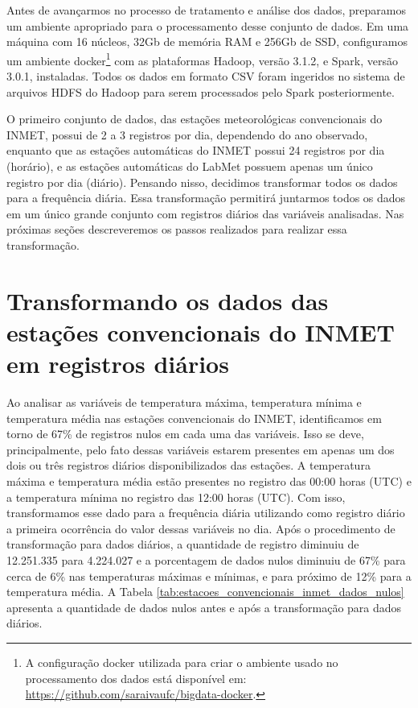 Antes de avançarmos no processo de tratamento e análise dos dados, preparamos um ambiente apropriado para o processamento desse conjunto de dados. 
Em uma máquina com 16 núcleos, 32Gb de memória RAM e 256Gb de SSD, configuramos um ambiente docker\footnote{A configuração docker utilizada para criar o ambiente usado no processamento dos dados está disponível em: \href{https://github.com/saraivaufc/bigdata-docker}{https://github.com/saraivaufc/bigdata-docker}.} com as plataformas Hadoop, versão 3.1.2, e Spark, versão 3.0.1, instaladas. Todos os dados em formato CSV foram ingeridos no sistema de arquivos HDFS do Hadoop para serem processados pelo Spark posteriormente.  

O primeiro conjunto de dados, das estações meteorológicas convencionais do INMET, possui de 2 a 3 registros por dia, dependendo do ano observado, enquanto que as estações automáticas do INMET possui 24 registros por dia (horário), e as estações automáticas do LabMet possuem apenas um único registro por dia (diário). Pensando nisso, decidimos transformar todos os dados para a frequência diária. Essa transformação permitirá juntarmos todos os dados em um único grande conjunto com registros diários das variáveis analisadas. Nas próximas seções descreveremos os passos realizados para realizar essa transformação. 

\section{Transformando os dados das estações convencionais do INMET em registros diários}

Ao analisar as variáveis de temperatura máxima, temperatura mínima e temperatura média nas estações convencionais do INMET, identificamos em torno de 67\% de registros nulos em cada uma das variáveis. Isso se deve, principalmente, pelo fato dessas variáveis estarem presentes em apenas um dos dois ou três registros diários disponibilizados das estações. A temperatura máxima e temperatura média estão presentes no registro das 00:00 horas (UTC) e a temperatura mínima no registro das 12:00 horas (UTC). Com isso, transformamos esse dado para a frequência diária utilizando como registro diário a primeira ocorrência do valor dessas variáveis no dia. Após o procedimento de transformação para dados diários, a quantidade de registro diminuiu de 12.251.335 para 4.224.027 e a porcentagem de dados nulos diminuiu de 67\% para cerca de 6\% nas temperaturas máximas e mínimas, e para próximo de 12\% para a temperatura média. A Tabela \ref{tab:estacoes_convencionais_inmet_dados_nulos} apresenta a quantidade de dados nulos antes e após a transformação para dados diários.  

